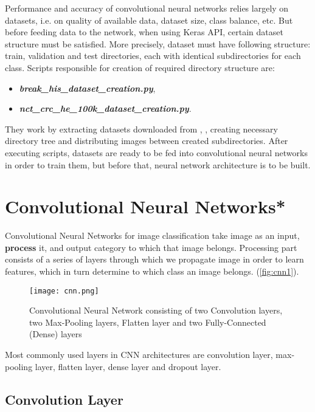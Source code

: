 Performance and accuracy of convolutional neural networks relies largely on datasets, i.e. on quality of available data, dataset size, class balance, etc. But before feeding data to the network, when using Keras API, certain dataset structure must be satisfied. More precisely, dataset must have following structure: train, validation and test directories, each with identical subdirectories for each class. Scripts responsible for creation of required directory structure are:
\begin{itemize}
	\itemsep 0em
	\item \emph{\textbf{break\_his\_dataset\_creation.py}},
	\item \emph{\textbf{nct\_crc\_he\_100k\_dataset\_creation.py}}.
\end{itemize} 
They work by extracting datasets downloaded from \cite{breakhis_bib}, \cite{nctcrche100k_bib}, creating necessary directory tree and distributing images between created subdirectories. After executing scripts, datasets are ready to be fed into convolutional neural networks in order to train them, but before that, neural network architecture is to be built.
\clearpage

\section{Convolutional Neural Networks*} \label{cnn}

Convolutional Neural Networks for image classification take image as an input, \textbf{process} it, and output category to which that image belongs. Processing part consists of a series of layers through which we propagate image in order to learn features, which in turn determine to which class an image belongs. (\textcolor{red}{\autoref{fig:cnn1}}).

\begin{figure}[h]
	\centering
	\texttt{[image: cnn.png]}
	\caption{Convolutional Neural Network consisting of two Convolution layers, two Max-Pooling layers, Flatten layer and two Fully-Connected (Dense) layers}
	\label{fig:cnn1}
\end{figure}

Most commonly used layers in CNN architectures are convolution layer, max-pooling layer, flatten layer, dense layer and dropout layer.

\subsection{Convolution Layer}

